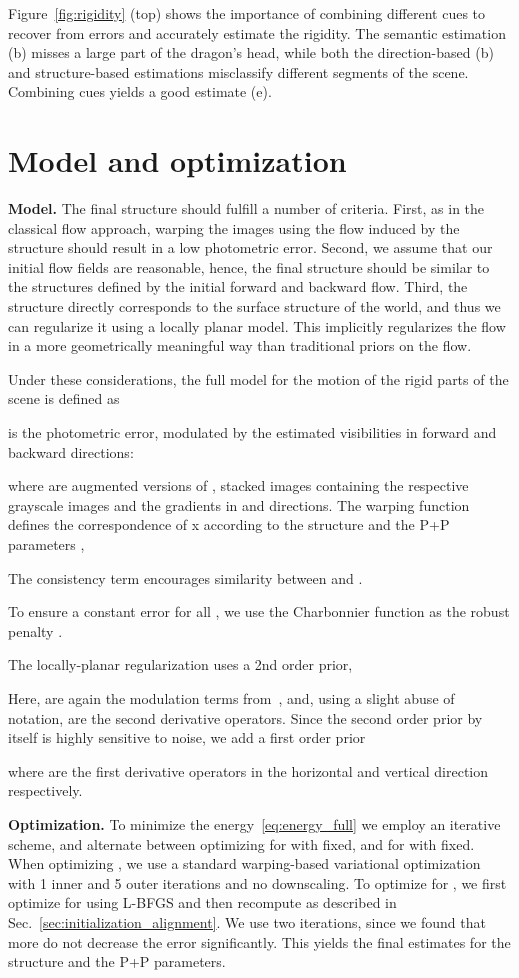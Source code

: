 \documentclass[10pt,twocolumn,letterpaper]{article}
\begin{document}
Figure~\ref{fig:rigidity} (top) shows the importance of combining different cues to recover from errors and accurately estimate the rigidity.
The semantic estimation (b) misses a large part of the dragon's head, while both the direction-based (b) and structure-based estimations misclassify different segments of the scene.
Combining cues yields a good estimate (e). \section{Model and optimization}
\label{sec:model}
\noindent
{\bf Model.}
The final structure should fulfill a number of criteria.
First, as in the classical flow approach, warping the images using the flow induced by the structure should result in a low photometric error.
Second, we assume that our initial flow fields are reasonable, hence, the final structure should be similar to the structures defined by the initial forward and backward flow.
Third, the structure directly corresponds to the surface structure of the world, and thus we can regularize it using a locally planar model. This implicitly regularizes the flow in a more geometrically meaningful way than traditional priors on the flow.

Under these considerations, the full model for the motion of the rigid parts of the scene is defined as 

 is the photometric error, modulated by the estimated visibilities in forward and backward directions:

where  are augmented versions of , \ie stacked images containing the respective grayscale images and the gradients in  and  directions.
The warping function  defines the correspondence of x according to the structure  and the P+P parameters ,

The consistency term  encourages similarity between  and .

To ensure a constant error for all , we use the Charbonnier function as the robust penalty .


The locally-planar regularization uses a 2nd order prior,

Here,  are again the modulation terms from~\cite{Rother:Grabcut}, and, using a slight abuse of notation,  are the second derivative operators.
Since the second order prior by itself is highly sensitive to noise, we add a first order prior

where  are the first derivative operators in the
horizontal and vertical direction respectively.

{\bf Optimization.}
To minimize the energy~\eqref{eq:energy_full} we employ an iterative scheme, and alternate between optimizing for  with  fixed, and for  with  fixed.
When optimizing , we use a standard warping-based variational optimization~\cite{Brox:TheoryOfWarping} with 1 inner and 5 outer iterations and no downscaling.
To optimize for , we first optimize for  using L-BFGS and then recompute  as described in Sec.~\ref{sec:initialization_alignment}.
We use two iterations, since we found that more do not decrease the error significantly.
This yields the final estimates  for the structure and the P+P parameters.
\end{document}
